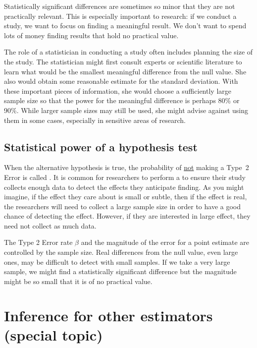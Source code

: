 Statistically significant differences are sometimes so minor that they are not practically relevant. This is especially important to research: if we conduct a study, we want to focus on finding a meaningful result. We don't want to spend lots of money finding results that hold no practical value.

The role of a statistician in conducting a study often includes planning the size of the study. The statistician might first consult experts or scientific literature to learn what would be the smallest meaningful difference from the null value. She also would obtain some reasonable estimate for the standard deviation. With these important pieces of information, she would choose a sufficiently large sample size so that the power for the meaningful difference is perhaps 80\% or 90\%. While larger sample sizes may still be used, she might advise against using them in some cases, especially in sensitive areas of research.


\subsection{Statistical power of a hypothesis test}

When the alternative hypothesis is true, the probability of \underline{not} making a Type~2 Error is called . It is common for researchers to perform a  to ensure their study collects enough data to detect the effects they anticipate finding. As you might imagine, if the effect they care about is small or subtle, then if the effect is real, the researchers will need to collect a large sample size in order to have a good chance of detecting the effect. However, if they are interested in large effect, they need not collect as much data.

The Type 2 Error rate $\beta$ and the magnitude of the error for a point estimate are controlled by the sample size. Real differences from the null value, even large ones, may be difficult to detect with small samples. If we take a very large sample, we might find a statistically significant difference but the magnitude might be so small that it is of no practical value.




\section{Inference for other estimators (special topic)}

